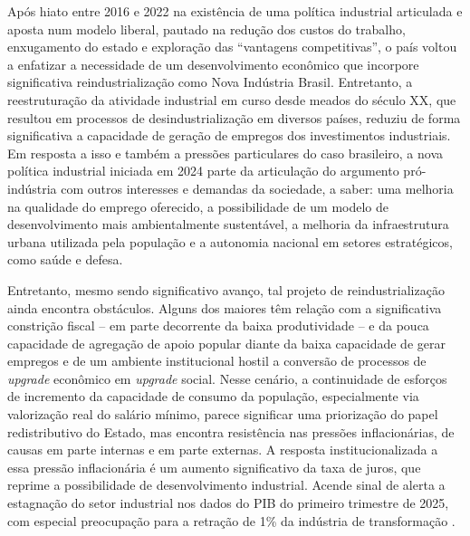 Após hiato entre 2016 e 2022 na existência de uma política industrial
articulada e aposta num modelo liberal, pautado na redução dos custos do
trabalho, enxugamento do estado e exploração das ``vantagens
competitivas'', o país voltou a enfatizar a necessidade de um
desenvolvimento econômico que incorpore significativa reindustrialização
como Nova Indústria Brasil. Entretanto, a reestruturação da atividade
industrial em curso desde meados do século XX, que resultou em processos
de desindustrialização em diversos países, reduziu de forma
significativa a capacidade de geração de empregos dos investimentos
industriais. Em resposta a isso e também a pressões particulares do caso
brasileiro, a nova política industrial iniciada em 2024 parte da
articulação do argumento pró-indústria com outros interesses e demandas
da sociedade, a saber: uma melhoria na qualidade do emprego oferecido, a
possibilidade de um modelo de desenvolvimento mais ambientalmente
sustentável, a melhoria da infraestrutura urbana utilizada pela
população e a autonomia nacional em setores estratégicos, como saúde e
defesa.

Entretanto, mesmo sendo significativo avanço, tal projeto de
reindustrialização ainda encontra obstáculos. Alguns dos maiores têm
relação com a significativa constrição fiscal -- em parte decorrente da
baixa produtividade -- e da pouca capacidade de agregação de apoio
popular diante da baixa capacidade de gerar empregos e de um ambiente
institucional hostil a conversão de processos de \emph{upgrade}
econômico em \emph{upgrade} social. Nesse cenário, a continuidade de
esforços de incremento da capacidade de consumo da população,
especialmente via valorização real do salário mínimo, parece significar
uma priorização do papel redistributivo do Estado, mas encontra
resistência nas pressões inflacionárias, de causas em parte internas e
em parte externas. A resposta institucionalizada a essa pressão
inflacionária é um aumento significativo da taxa de juros, que reprime a
possibilidade de desenvolvimento industrial. Acende sinal de alerta a
estagnação do setor industrial nos dados do PIB do primeiro trimestre de
2025, com especial preocupação para a retração de 1\% da indústria de
transformação .

